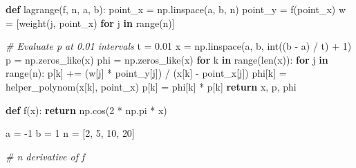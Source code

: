 \documentclass[
]{article}
\newenvironment{Shaded}{}{}
\newcommand{\BuiltInTok}[1]{\textcolor[rgb]{0.00,0.50,0.00}{#1}}
\newcommand{\CommentTok}[1]{\textcolor[rgb]{0.38,0.63,0.69}{\textit{#1}}}
\newcommand{\ControlFlowTok}[1]{\textcolor[rgb]{0.00,0.44,0.13}{\textbf{#1}}}
\newcommand{\DecValTok}[1]{\textcolor[rgb]{0.25,0.63,0.44}{#1}}
\newcommand{\FloatTok}[1]{\textcolor[rgb]{0.25,0.63,0.44}{#1}}
\newcommand{\KeywordTok}[1]{\textcolor[rgb]{0.00,0.44,0.13}{\textbf{#1}}}
\newcommand{\NormalTok}[1]{#1}
\newcommand{\OperatorTok}[1]{\textcolor[rgb]{0.40,0.40,0.40}{#1}}
\begin{document}
\begin{Shaded}
\begin{Highlighting}[]
    
\KeywordTok{def}\NormalTok{ lagrange(f, n, a, b):}
\NormalTok{    point\_x }\OperatorTok{=}\NormalTok{ np.linspace(a, b, n)}
\NormalTok{    point\_y }\OperatorTok{=}\NormalTok{ f(point\_x)}
\NormalTok{    w }\OperatorTok{=}\NormalTok{ [weight(j, point\_x) }\ControlFlowTok{for}\NormalTok{ j }\KeywordTok{in} \BuiltInTok{range}\NormalTok{(n)]}
    
    \CommentTok{\# Evaluate p at 0.01 intervals}
\NormalTok{    t }\OperatorTok{=} \FloatTok{0.01}
\NormalTok{    x }\OperatorTok{=}\NormalTok{ np.linspace(a, b, }\BuiltInTok{int}\NormalTok{((b }\OperatorTok{{-}}\NormalTok{ a) }\OperatorTok{/}\NormalTok{ t) }\OperatorTok{+} \DecValTok{1}\NormalTok{)}
\NormalTok{    p }\OperatorTok{=}\NormalTok{ np.zeros\_like(x)}
\NormalTok{    phi }\OperatorTok{=}\NormalTok{ np.zeros\_like(x)}
    \ControlFlowTok{for}\NormalTok{ k }\KeywordTok{in} \BuiltInTok{range}\NormalTok{(}\BuiltInTok{len}\NormalTok{(x)):}
        \ControlFlowTok{for}\NormalTok{ j }\KeywordTok{in} \BuiltInTok{range}\NormalTok{(n):}
\NormalTok{            p[k] }\OperatorTok{+=}\NormalTok{ (w[j] }\OperatorTok{*}\NormalTok{ point\_y[j]) }\OperatorTok{/}\NormalTok{ (x[k] }\OperatorTok{{-}}\NormalTok{ point\_x[j])}
\NormalTok{        phi[k] }\OperatorTok{=}\NormalTok{ helper\_polynom(x[k], point\_x)}
\NormalTok{        p[k] }\OperatorTok{=}\NormalTok{ phi[k] }\OperatorTok{*}\NormalTok{ p[k]}
    \ControlFlowTok{return}\NormalTok{ x, p, phi}

\KeywordTok{def}\NormalTok{ f(x):}
    \ControlFlowTok{return}\NormalTok{ np.cos(}\DecValTok{2} \OperatorTok{*}\NormalTok{ np.pi }\OperatorTok{*}\NormalTok{ x)}

\NormalTok{a }\OperatorTok{=} \OperatorTok{{-}}\DecValTok{1}
\NormalTok{b }\OperatorTok{=} \DecValTok{1}
\NormalTok{n }\OperatorTok{=}\NormalTok{ [}\DecValTok{2}\NormalTok{, }\DecValTok{5}\NormalTok{, }\DecValTok{10}\NormalTok{, }\DecValTok{20}\NormalTok{]}

\CommentTok{\# n derivative of f}


\end{Highlighting}
\end{Shaded}
\end{document}
